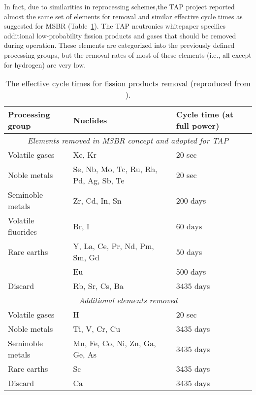 In fact, due to similarities in reprocessing schemes,the \gls{TAP} project reported 
almost 
the same set of elements for removal and similar effective cycle times 
as suggested 
for \gls{MSBR} (Table~\ref{tab:reprocessing_list}). The \gls{TAP} neutronics whitepaper 
specifies additional low-probability fission products and gases that should be 
removed during operation. These elements are categorized into the previously 
defined processing groups, but the removal rates of most of these elements 
(i.e., all except for hydrogen) are very low.
\begin{table}[ht!]
        \centering
        \caption{The effective cycle times for fission products removal (reproduced from \cite{betzler_implementation_2017}).}
        \begin{tabular}{p{} p{} p{}}
        \hline 
        Processing group & \qquad\qquad\qquad Nuclides & Cycle time (at full power) \\ [5pt] \hline 
 \multicolumn{3}{c}{\textit{Elements removed in \gls{MSBR} concept and adopted for \gls{TAP}} \cite{robertson_conceptual_1971, rykhlevskii_modeling_2019}} \\
        Volatile gases & Xe, Kr								  & 20 sec \\ [5pt]
        Noble metals & Se, Nb, Mo, Tc, Ru, Rh, Pd, Ag, Sb, Te & 20 sec \\ [5pt]
        Seminoble metals & Zr, Cd, In, Sn	  				  & 200 days \\ [5pt]
        Volatile fluorides & Br, I 							  & 60 days \\ [5pt]
        Rare earths & Y, La, Ce, Pr, Nd, Pm, Sm, Gd & 50 days \\ [5pt]
        \qquad & Eu & 500 days \\ [5pt]
        Discard & Rb, Sr, Cs, Ba & 3435 days \\ [5pt] 
        \hline
 
 \multicolumn{3}{c}{\textit{Additional elements removed} \cite{transatomic_power_corporation_neutronics_2016}  } \\
        Volatile gases & H								  		& 20 sec    \\ [5pt]
        Noble metals & Ti, V, Cr, Cu						    & 3435 days \\ [5pt]
        Seminoble metals & Mn, Fe, Co, Ni, Zn, Ga, Ge, As       & 3435 days \\ [5pt]
        Rare earths & Sc										& 3435 days \\ [5pt]
        Discard & Ca											& 3435 days \\ [5pt] 
        \hline
        \end{tabular}
        \label{tab:reprocessing_list}
          \vspace{-0.9em}
\end{table}

